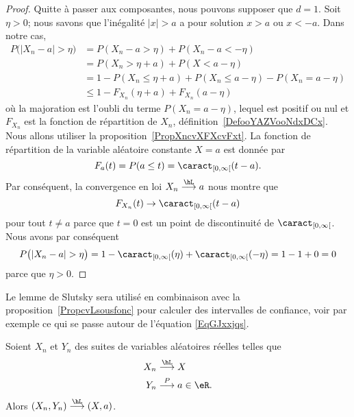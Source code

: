 \begin{proof}
	Quitte à passer aux composantes, nous pouvons supposer que \( d=1\). Soit \( \eta>0\); nous savons que l'inégalité \( | x |>a\) a pour solution \( x>a\) ou \( x<-a\). Dans notre cas,
	\begin{subequations}
		\begin{align}
			P\big( | X_n-a |>\eta \big) & =P(X_n-a>\eta)+P(X_n-a<-\eta)                        \\
			                            & =P(X_n>\eta+a)+P(X<a-\eta)                           \\
			                            & =1-P(X_n\leq \eta+a)+P(X_n\leq a-\eta)-P(X_n=a-\eta) \\
			                            & \leq 1-F_{X_n}(\eta+a)+F_{X_n}(a-\eta)
		\end{align}
	\end{subequations}
	où la majoration est l'oubli du terme \( P(X_n=a-\eta)\), lequel est positif ou nul et \( F_{X_n}\) est la fonction de répartition de \( X_n\), définition~\ref{DefooYAZVooNdxDCx}. Nous allons utiliser la proposition~\ref{PropXncvXFXcvFxt}. La fonction de répartition de la variable aléatoire constante \( X=a\) est donnée par
	\begin{equation}
		F_a(t)=P(a\leq t)=\caract_{\mathopen[ 0 , \infty \mathclose[}(t-a).
	\end{equation}
	Par conséquent, la convergence en loi \( X_n\stackrel{\hL}{\longrightarrow}a\) nous montre que
	\begin{equation}
		F_{X_n}(t)\to \caract_{\mathopen[ 0 , \infty \mathclose[}(t-a)
	\end{equation}
	pour tout \( t\neq a\) parce que \( t=0\) est un point de discontinuité de \( \caract_{\mathopen[ 0 , \infty \mathclose[}\). Nous avons par conséquent
	\begin{equation}
		P\big( | X_n-a |>\eta \big)=1-\caract_{\mathopen[ 0 , \infty \mathclose[}(\eta)+\caract_{\mathopen[ 0 , \infty \mathclose[}(-\eta)=1-1+0=0
	\end{equation}
	parce que \( \eta>0\).
\end{proof}

Le lemme de Slutsky sera utilisé en combinaison avec la proposition~\ref{PropcvLsousfonc} pour calculer des intervalles de confiance, voir par exemple ce qui se passe autour de l'équation \eqref{EqGJxxjqs}.
\begin{lemma}  \label{LemgXDlhs}
	Soient \( X_n\) et \( Y_n\) des suites de variables aléatoires réelles telles que
	\begin{equation}
		\begin{aligned}[]
			X_n & \stackrel{\hL}{\longrightarrow} X     \\
			Y_n & \stackrel{P}{\longrightarrow}a\in\eR.
		\end{aligned}
	\end{equation}
	Alors \( (X_n,Y_n)\stackrel{\hL}{\longrightarrow}(X,a)\).
\end{lemma}


